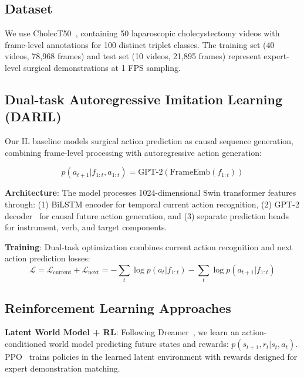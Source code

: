 \documentclass[runningheads]{llncs}
\begin{document}
\subsection{Dataset}

We use CholecT50~\cite{nwoye2022cholect50}, containing 50 laparoscopic cholecystectomy videos with frame-level annotations for 100 distinct triplet classes. The training set (40 videos, 78,968 frames) and test set (10 videos, 21,895 frames) represent expert-level surgical demonstrations at 1 FPS sampling.

\subsection{Dual-task Autoregressive Imitation Learning (DARIL)}

Our IL baseline models surgical action prediction as causal sequence generation, combining frame-level processing with autoregressive action generation:

\begin{equation}
p(a_{t+1}|f_{1:t}, a_{1:t}) = \text{GPT-2}(\text{FrameEmb}(f_{1:t}))
\end{equation}

\textbf{Architecture}: The model processes 1024-dimensional Swin transformer features~\cite{liu2021swin} through: (1) BiLSTM encoder for temporal current action recognition, (2) GPT-2 decoder~\cite{radford2019language} for causal future action generation, and (3) separate prediction heads for instrument, verb, and target components.

\textbf{Training}: Dual-task optimization combines current action recognition and next action prediction losses:
\begin{equation}
\mathcal{L} = \mathcal{L}_{\text{current}} + \mathcal{L}_{\text{next}} = -\sum_{t} \log p(a_t|f_{1:t}) - \sum_{t} \log p(a_{t+1}|f_{1:t})
\end{equation}

\subsection{Reinforcement Learning Approaches}

\textbf{Latent World Model + RL}: Following Dreamer~\cite{hafner2020dream}, we learn an action-conditioned world model predicting future states and rewards: $p(s_{t+1}, r_t|s_t, a_t)$. PPO~\cite{schulman2017proximal} trains policies in the learned latent environment with rewards designed for expert demonstration matching.
\end{document}
